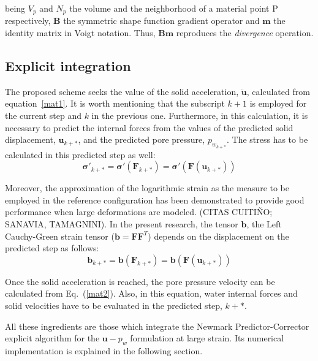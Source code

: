 \documentclass[twocolumn]{svjour3}          %
\begin{document}
  being $V_p$ and $N_p$ the volume and the neighborhood of a material point P respectively, $\mathbf{B}$ the symmetric shape function gradient operator and $\mathbf{m}$ the identity matrix in Voigt notation. Thus, $\mathbf{B}\mathbf{m}$ reproduces the \textit{divergence} operation.
  
\subsection{Explicit integration}
\label{subsec:42}
The proposed scheme seeks the value of the solid acceleration, $\ddot{\boldsymbol{u}}$, calculated from equation~\eqref{mat1}. It is worth mentioning that the subscript $k+1$ is employed for the current step and $k$ in the previous one. Furthermore, in this calculation, it is necessary to predict the internal forces from the values of the predicted solid displacement, $\boldsymbol{u}_{k+*}$, and the predicted pore pressure, $p_{w_{k+*}}$. The stress has to be calculated in this predicted step as well:
$$
\boldsymbol{\sigma'}_{k+*}=\boldsymbol{\sigma'}(\boldsymbol{F}_{k+*})=\boldsymbol{\sigma'}(\boldsymbol{F}(\boldsymbol{u}_{k+*}))
$$

Moreover, the approximation of the logarithmic strain as the measure to be employed in the reference configuration has been demonstrated to provide good performance when large deformations are modeled. (CITAS CUITIÑO; SANAVIA, TAMAGNINI). In the present research, the tensor $\mathbf{b}$, the Left Cauchy-Green strain tensor ($\mathbf{b}=\mathbf{F}\mathbf{F}^T$) depends on the displacement on the predicted step as follows:
 $$
 \mathbf{b}_{k+*}=\mathbf{b}(\mathbf{F}_{k+*})=\mathbf{b}(\mathbf{F}(\boldsymbol{u}_{k+*}))
 $$

Once the solid acceleration is reached, the pore pressure velocity can be calculated from Eq.~(\ref{mat2}). Also, in this equation, water internal forces and solid velocities have to be evaluated in the predicted step, $k+*$.

All these ingredients are those which integrate the Newmark Predictor-Corrector explicit algorithm for the $\boldsymbol{u}-p_w$ formulation at large strain. Its numerical implementation is explained in the following section.

\end{document}
